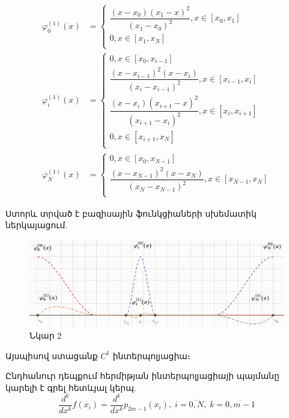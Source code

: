 \documentclass[fleqn, bachelor,subf,12pt,notitlepage]{disser}
\begin{document}
\begin{align*}
\varphi^{(1)}_{0}\left(x\right)&=\begin{cases}
\dfrac{\left(x-x_{0}\right)\left(x_{1}-x\right)^{2}}{\left(x_{1}-x_{0}\right)^{2}}, x\in \left[x_{0}, x_{1}\right]\\
0, x\in \left[x_{1}, x_{N}\right]\\
\end{cases}\\
\varphi^{(1)}_{i}\left(x\right)&=\begin{cases}
0, x\in \left[x_{0}, x_{i-1}\right]\\
\dfrac{\left(x-x_{i-1}\right)^2\left(x-x_{i}\right)}{\left(x_{i}-x_{i-1}\right)^{2}}, x\in \left[x_{i-1}, x_{i}\right]\\
\dfrac{\left(x-x_{i}\right)\left(x_{i+1}-x\right)^{2}}{\left(x_{i+1}-x_{i}\right)^{2}}, x\in \left[x_{i}, x_{i+1}\right]\\
0, x\in \left[x_{i+1}, x_{N}\right]\\
\end{cases}\\
\varphi^{(1)}_{N}\left(x\right)&=\begin{cases}
0, x\in \left[x_{0}, x_{N-1}\right]\\
\dfrac{\left(x-x_{N-1}\right)^{2}\left(x-x_{N}\right)}{\left(x_{N}-x_{N-1}\right)^{2}}, x\in \left[x_{N-1}, x_{N}\right]\\
\end{cases}
\end{align*}

Ստորև տրված է բազիսային ֆունկցիաների սխեմատիկ ներկայացում.
\begin{figure}[h!]
\centering
\includegraphics[width=1.0\textwidth]{images/one_var_quadratic}
\captionsetup{labelformat=empty}
\caption{\hfill Նկար 2}
\end{figure}

Այսպիսով ստացանք $C^{1}$ ինտերպոլյացիա։

Ընդհանուր դեպքում հերմիթյան ինտերպոլյացիայի պայմանը կարելի է գրել հետևյալ կերպ.
$$\dfrac{d^{k}}{dx^{k}}f\left(x_{i}\right)=\dfrac{d^{k}}{dx^{k}}p_{2m-1}\left(x_{i}\right), \;  i=\overline{0, N}, \;  k=\overline{0, m-1}$$
\end{document}
